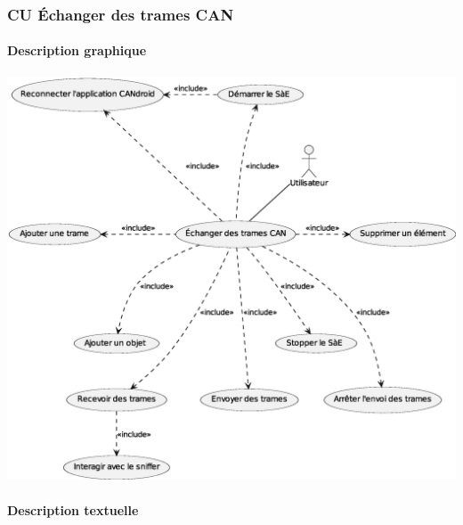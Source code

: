 \newpage
\subsubsection{CU Échanger des trames CAN}
\paragraph{Description graphique}
\medskip
\begin{minipage}{1\linewidth}
    \centering
    \includegraphics[width=15cm]{../../specification/schemas/cu_strat}
    \label{schema_cu_strat}
\end{minipage}

\newpage
\paragraph{Description textuelle}
\medskip

